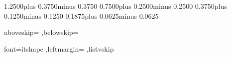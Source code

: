 


\frenchspacing

\newlength{\hugeskipamount}
\setlength{\hugeskipamount}  {1.2500\baselineskip plus 0.3750\baselineskip minus 0.3750\baselineskip}
\setlength{\bigskipamount}   {0.7500\baselineskip plus 0.2500\baselineskip minus 0.2500\baselineskip}
\setlength{\medskipamount}   {0.3750\baselineskip plus 0.1250\baselineskip minus 0.1250\baselineskip}
\setlength{\smallskipamount} {0.1875\baselineskip plus 0.0625\baselineskip minus 0.0625\baselineskip}







\setlength{\abovedisplayskip}{\smallskipamount}
\setlength{\belowdisplayskip}{\smallskipamount}

\renewcommand{\MathparLineskip}{
  \setlength{\lineskiplimit}{\bigskipamount}
  \setlength{\lineskip}{\bigskipamount}
}



\setlength{\abovecaptionskip}{\medskipamount}
\setlength{\floatsep}        {\medskipamount}
\setlength{\textfloatsep}    {\bigskipamount}
\setlength{\intextsep}       {\medskipamount}
\setlength{\dblfloatsep}     {\medskipamount}
\setlength{\dbltextfloatsep} {\bigskipamount}



\setlength{\pltopsep}   {\medskipamount}
\setlength{\plpartopsep}{\parskip}
\setlength{\plitemsep}  {\parskip}
\setlength{\plparsep}   {\parskip}



\lstset
  {aboveskip=\smallskipamount
  ,belowskip=\smallskipamount
  }






\quotingsetup
  {font=itshape
  ,leftmargin=\parindent
  ,listvskip}



